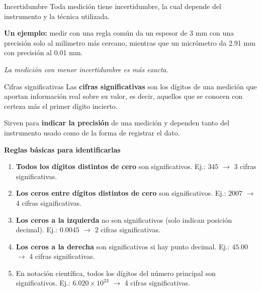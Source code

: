 \begin{frame}{Incertidumbre}
    Toda medición tiene incertidumbre, la cual depende del instrumento y la técnica utilizada.

\vspace{1em}
    
\textbf{Un ejemplo:} medir con una regla común da un espesor de 3 mm con una precisión solo al milímetro más cercano, mientras que un micrómetro da 2.91 mm con precisión al 0.01 mm.

\vspace{1em}

\textit{La medición con menor incertidumbre es más exacta}.
\end{frame}

\begin{frame}{Cifras significativas}
    Las \textbf{cifras significativas} son los dígitos de una medición que aportan 
información real sobre su valor, es decir, aquellos que se conocen con certeza 
más el primer dígito incierto.

\vspace{1em}

Sirven para \textbf{indicar la precisión} de una medición y dependen tanto del 
instrumento usado como de la forma de registrar el dato.
\end{frame}

\begin{frame}
    \textbf{Reglas básicas para identificarlas}
\begin{enumerate}
    \item \textbf{Todos los dígitos distintos de cero} son significativos.  
    Ej.: $345$ $\rightarrow$ 3 cifras significativas.
    
    \item \textbf{Los ceros entre dígitos distintos de cero} son significativos.  
    Ej.: $2007$ $\rightarrow$ 4 cifras significativas.
    
    \item \textbf{Los ceros a la izquierda} no son significativos 
    (solo indican posición decimal).  
    Ej.: $0.0045$ $\rightarrow$ 2 cifras significativas.
    
    \item \textbf{Los ceros a la derecha} son significativos si hay punto decimal.  
    Ej.: $45.00$ $\rightarrow$ 4 cifras significativas.
    
    \item En notación científica, todos los dígitos del número principal son 
    significativos.  
    Ej.: $6.020 \times 10^{23}$ $\rightarrow$ 4 cifras significativas.
\end{enumerate}
\end{frame}

